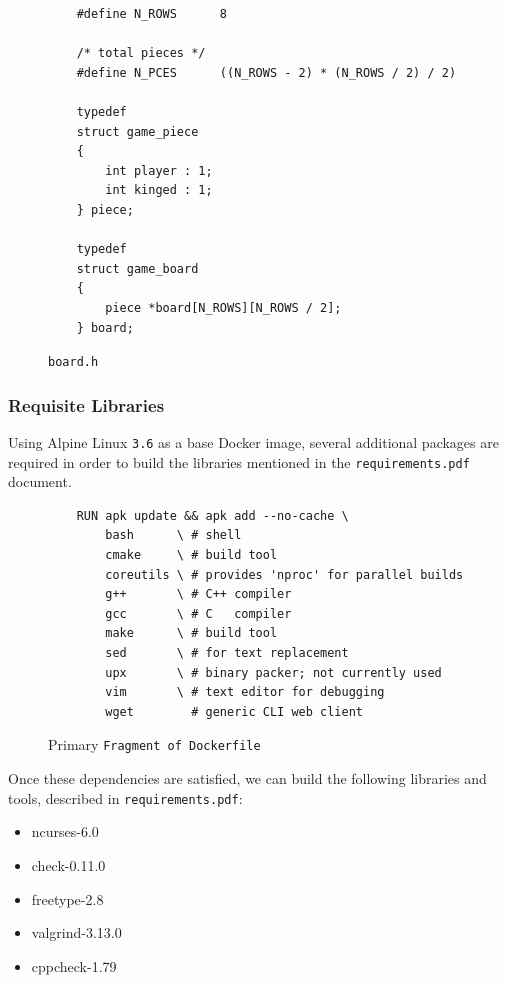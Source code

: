 \documentclass[letterpaper]{article}
\begin{document}
\begin{figure}
    \lstset{keepspaces=true}
    \begin{lstlisting}
    #define N_ROWS      8

    /* total pieces */
    #define N_PCES      ((N_ROWS - 2) * (N_ROWS / 2) / 2)

    typedef
    struct game_piece
    {
        int player : 1;
        int kinged : 1;
    } piece;

    typedef
    struct game_board
    {
        piece *board[N_ROWS][N_ROWS / 2];
    } board;
    \end{lstlisting}
    \caption{\texttt{board.h}}
    \label{fig:architecture_system1}
\end{figure}

\subsubsection{Requisite Libraries}
\label{sec:architecture_system1_part1}

Using Alpine Linux \texttt{3.6} as a base Docker image, several
additional packages are required in order to build the libraries
mentioned in the \texttt{requirements.pdf} document.

\lstset{basicstyle=\ttfamily}
\lstset{frame=tb}
\begin{figure}
    \begin{lstlisting}
    RUN apk update && apk add --no-cache \
        bash      \ # shell
        cmake     \ # build tool
        coreutils \ # provides 'nproc' for parallel builds
        g++       \ # C++ compiler
        gcc       \ # C   compiler
        make      \ # build tool
        sed       \ # for text replacement
        upx       \ # binary packer; not currently used
        vim       \ # text editor for debugging
        wget        # generic CLI web client
    \end{lstlisting}
    \caption{Primary \texttt{Fragment of \texttt{Dockerfile}}}
    \label{fig:architecture_system1_part1_req1}
\end{figure}

Once these dependencies are satisfied, we can build the following
libraries and tools, described in \texttt{requirements.pdf}:

\begin{itemize}
    \item ncurses-6.0
    \item check-0.11.0
    \item freetype-2.8
    \item valgrind-3.13.0
    \item cppcheck-1.79
\end{itemize}
\end{document}
